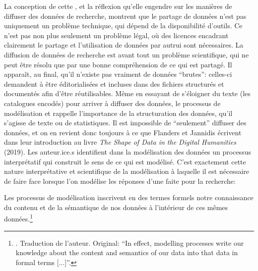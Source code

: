La conception de cette \api{}, et la réflexion qu'elle engendre sur les manières de diffuser des données de recherche, montrent que le partage de données n'est pas uniquement un problème technique, qui dépend de la disponibilité d'outils. Ce n'est pas non plus seulement un problème légal, où des licences encadrant clairement le partage et l'utilisation de données par autrui sont nécessaires. La diffusion de données de recherche est avant tout un problème scientifique, qui ne peut être résolu que par une bonne compréhension de ce qui est partagé. Il apparaît, au final, qu'il n'existe pas vraiment de données \enquote{brutes}: celles-ci demandent à être éditorialisées et incluses dans des fichiers structurés et documentés afin d'être réutilisables. Même en essayant de s'éloigner du texte (les catalogues encodés) pour arriver à diffuser des données, le processus de modélisation et rappelle l'importance de la structuration des données, qu'il s'agisse de texte ou de statistiques. Il est impossible de \enquote{seulement} diffuser des données, et on en revient donc toujours à ce que Flanders et Jannidis écrivent dans leur introduction au livre \textit{The Shape of Data in the Digital Humanities} (2019). Les auteur.ice.s identifient dans la modélisation des données un processus interprétatif qui construit le sens de ce qui est modélisé. C'est exactement cette nature interprétative et scientifique de la modélisation à laquelle il est nécessaire de faire face lorsque l'on modélise les réponses d'une \api{} faite pour la recherche:

\pagebreak

\begin{displayquote}
	Les processus de modélisation inscrivent en des termes formels notre connaissance du contenu et de la sémantique de nos données à l'intérieur de ces mêmes données.\footnote{
		\cite[p. 9]{flanders_data_2019}. Traduction de l'auteur. Original: \enquote{In effect, modelling processes write our knowledge about the content and semantics of our data into that data in formal terms [...]}.
	}
\end{displayquote}


